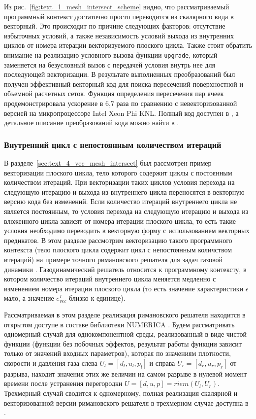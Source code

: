 Из рис.~\ref{fig:text_1_mesh_intersect_scheme} видно, что рассматриваемый программный контекст достаточно просто переводится из скалярного вида в векторный.
Это происходит по причине следующих факторов: отсутствие избыточных условий, а также независимость условий выхода из внутренних циклов от номера итерации векторизуемого плоского цикла.
Также стоит обратить внимание на реализацию условного вызова функции \texttt{upgrade}, который заменяется на безусловный вызов с передачей условия внутрь нее для последующей векторизации.
В результате выполненных преобразований был получен эффективный векторный код для поиска пересечений поверхностной и объемной расчетных сеток.
Функция определения пересечения пар ячеек продемонстрировала ускорение в 6,7 раза по сравнению с невекторизованной версией на микропроцессоре Intel Xeon Phi KNL\label{abbr:knl-10}.
Полный код доступен в \cite{iparGithub}, а детальное описание преобразований кода можно найти в \cite{Rybakov2019VecInt}.

\subsubsection{Внутренний цикл с непостоянным количеством итераций}\label{sec:text_4_vec_riemann}

В разделе~\ref{sec:text_4_vec_mesh_intersect} был рассмотрен пример векторизации плоского цикла, тело которого содержит циклы с постоянным количеством итераций.
При векторизации таких циклов условия перехода на следующую итерацию и выхода из внутреннего цикла переносятся в векторную версию кода без изменений.
Если количество итераций внутреннего цикла не является постоянным, то условия перехода на следующую итерацию и выхода из вложенного цикла зависят от номера итерации плоского цикла, то есть такие условия необходимо переводить в векторную форму с использованием векторных предикатов.
В этом разделе рассмотрим векторизацию такого программного контекста (тело плоского цикла содержит цикл с непостоянным количством итераций) на примере точного римановского решателя для задач газовой динамики \cite{Rybakov2019VecRiem1,Rybakov2019VecRiem2}.
Газодинамический решатель относится к программному контексту, в котором количество итераций внутреннего цикла меняется медленно с изменением номера итерации плоского цикла (то есть значение характеристики $\epsilon$ мало, а значение $e_{vec}^I$ близко к единице).

Рассматриваемая в этом разделе реализация римановского решателя находится в открытом доступе в составе библиотеки NUMERICA \cite{numericaGithub}.
Будем рассматривать одномерный случай для однокомпонентной среды, реализованный в виде чистой функции (функции без побочных эффектов, результат работы функции зависит только от значений входных параметров), которая по значениям плотности, скорости и давления газа слева $U_l = [d_l, u_l, p_l]$ и справа $U_r = [d_r, u_r, p_r]$ от разрыва, находит значения этих же величин на самом разрыве в нулевой момент времени после устранения перегородки $U = [d, u, p] = riem(U_l, U_r)$.
Трехмерный случай сводится к одномерному, полная реализация скалярной и векторизованной версии римановского решателя в трехмерном случае доступна в \cite{riemannvecGithub}.


